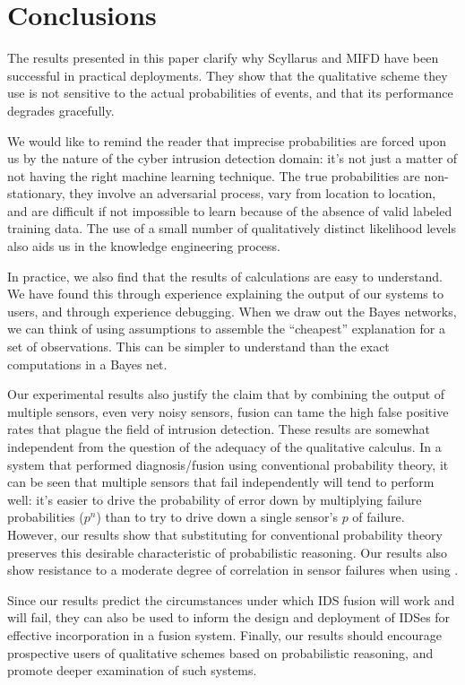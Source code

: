 
\section{Conclusions}
\label{sec:conclusions}

The results presented in this paper clarify why Scyllarus and
MIFD have been successful in practical deployments.
They show that the qualitative scheme they use is not sensitive to
the actual probabilities of events, and that its performance degrades
gracefully.

We would like to remind the reader that imprecise probabilities 
are forced upon us by the nature of the cyber intrusion detection domain: it's
not just a matter of not having the right machine learning technique.  The
true probabilities are non-stationary, they involve an adversarial process,
vary from location to location, and are difficult if not impossible to learn
because of the absence of valid labeled training data.
The use of a small number of qualitatively distinct likelihood levels also aids
us in the knowledge engineering process.

In practice, we also find that the results of \zplus calculations are easy to
understand.  We have found this through experience explaining the output of our
systems to users, and through experience debugging.  When we draw out the Bayes
networks, we can think of using assumptions to assemble the ``cheapest''
explanation for a set of observations.  This can be simpler to understand than
the exact computations in a Bayes net.

Our experimental results also justify the claim that by combining the output of
multiple sensors, even very noisy sensors, \ids fusion can tame the high false
positive rates that plague the field of intrusion detection.  These results are
somewhat independent from the question of the adequacy of the qualitative
calculus.  In a system that performed diagnosis/fusion using conventional
probability theory, it can be seen that multiple sensors that fail independently
will tend to perform well:  it's easier to drive the probability of error down
by multiplying failure probabilities ($p^n$) than to try to drive down a single
sensor's $p$ of failure.  However, our results show that substituting \zplus for
conventional probability theory preserves this desirable characteristic of
probabilistic reasoning. Our results also show resistance to a moderate degree
of correlation in sensor failures when using \zplus.

Since our results predict the circumstances under which IDS fusion will work and
will fail, they can also be used to inform the design and deployment of IDSes
for effective incorporation in a fusion system.
Finally, our results should encourage prospective users
of qualitative schemes based on probabilistic reasoning,
and promote deeper examination of %
such systems.


